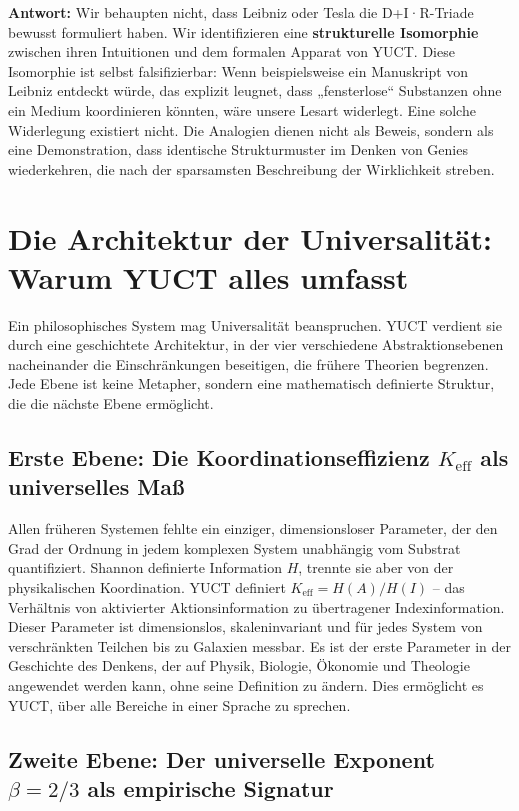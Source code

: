 \documentclass[12pt,a4paper]{article}
\newcommand{\Keff}{K_{\mathrm{eff}}}
\begin{document}
\textbf{Antwort:} Wir behaupten nicht, dass Leibniz oder Tesla die D+I·R-Triade bewusst formuliert haben. Wir identifizieren eine \textbf{strukturelle Isomorphie} zwischen ihren Intuitionen und dem formalen Apparat von YUCT. Diese Isomorphie ist selbst falsifizierbar: Wenn beispielsweise ein Manuskript von Leibniz entdeckt würde, das explizit leugnet, dass „fensterlose“ Substanzen ohne ein Medium koordinieren könnten, wäre unsere Lesart widerlegt. Eine solche Widerlegung existiert nicht. Die Analogien dienen nicht als Beweis, sondern als eine Demonstration, dass identische Strukturmuster im Denken von Genies wiederkehren, die nach der sparsamsten Beschreibung der Wirklichkeit streben.

\section{Die Architektur der Universalität: Warum YUCT alles umfasst}
\label{sec:architecture-of-universality}

Ein philosophisches System mag Universalität beanspruchen. YUCT verdient sie durch eine geschichtete Architektur, in der vier verschiedene Abstraktionsebenen nacheinander die Einschränkungen beseitigen, die frühere Theorien begrenzen. Jede Ebene ist keine Metapher, sondern eine mathematisch definierte Struktur, die die nächste Ebene ermöglicht.

\subsection{Erste Ebene: Die Koordinationseffizienz \(K_{\mathrm{eff}}\) als universelles Maß}

Allen früheren Systemen fehlte ein einziger, dimensionsloser Parameter, der den Grad der Ordnung in jedem komplexen System unabhängig vom Substrat quantifiziert. Shannon definierte Information \(H\), trennte sie aber von der physikalischen Koordination. YUCT definiert \(\Keff = H(A)/H(I)\) – das Verhältnis von aktivierter Aktionsinformation zu übertragener Indexinformation. Dieser Parameter ist dimensionslos, skaleninvariant und für jedes System von verschränkten Teilchen bis zu Galaxien messbar. Es ist der erste Parameter in der Geschichte des Denkens, der auf Physik, Biologie, Ökonomie und Theologie angewendet werden kann, ohne seine Definition zu ändern. Dies ermöglicht es YUCT, über alle Bereiche in einer Sprache zu sprechen.

\subsection{Zweite Ebene: Der universelle Exponent \(\beta = 2/3\) als empirische Signatur}
\end{document}
